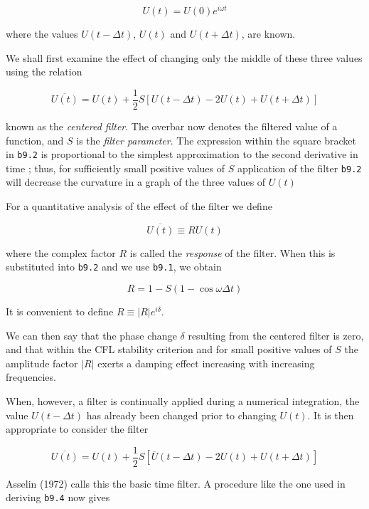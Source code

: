 \[U\left( t \right) = U\left( 0 \right)e^{i\omega t}\]

where the values \(U\left( t - \Delta t \right)\), \(U\left( t \right)\)
and \(U\left( t + \Delta t \right)\), are known.

We shall first examine the effect of changing only the middle of these
three values using the relation

\[\overline{U(t)} = U(t) + \frac{1}{2}S  \left[ U\left( t - \Delta t \right) - 2U\left( t \right) + U\left( t + \Delta t \right) \right]\]

known as the \emph{centered filter}. The overbar now denotes the
filtered value of a function, and \(S\) is the \emph{filter parameter}.
The expression within the square bracket in \texttt{b9.2} is
proportional to the simplest approximation to the second derivative in
time ; thus, for sufficiently small positive values of \(S\) application
of the filter \texttt{b9.2} will decrease the curvature in a graph of
the three values of \(U(t)\)

For a quantitative analysis of the effect of the filter we define

\[\overline{U(t)} \equiv R U(t)\]

where the complex factor \(R\) is called the \emph{response} of the
filter. When this is substituted into \texttt{b9.2} and we use
\texttt{b9.1}, we obtain

\[R = 1 - S\left( 1 - \cos{\omega\Delta t} \right)\]

It is convenient to define \(R \equiv \left| R \right|e^{i\delta}\).

We can then say that the phase change \(\delta\) resulting from the
centered filter is zero, and that within the CFL stability criterion and
for small positive values of \(S\) the amplitude factor
\(\left| R \right|\) exerts a damping effect increasing with increasing
frequencies.

When, however, a filter is continually applied during a numerical
integration, the value \(U\left( t - \Delta t \right)\) has already been
changed prior to changing \(U(t)\). It is then appropriate to consider
the filter

\[\overline{U(t)} = U\left( t \right) + \frac{1}{2}S \left\lbrack \overline{U}\left( t - \Delta t \right) - 2U\left( t \right) + U\left( t + \Delta t \right) \right\rbrack\]

Asselin (1972) calls this the basic time filter. A procedure like the
one used in deriving \texttt{b9.4} now gives

